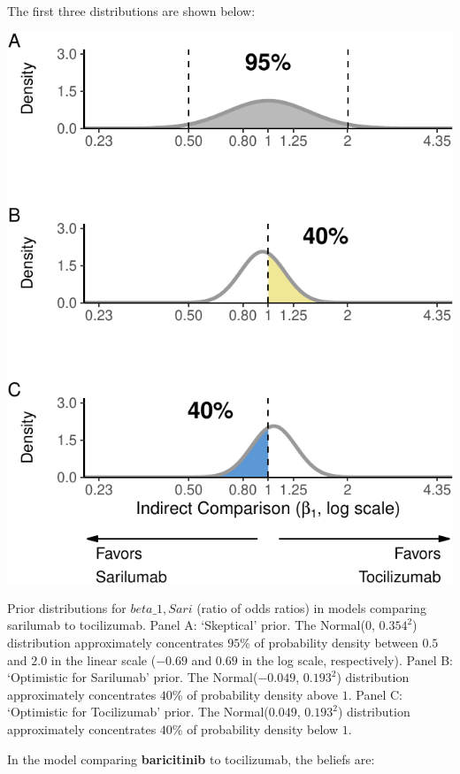 \documentclass[
  12pt,
]{article}
\begin{document}
The first three distributions are shown below:

\begin{center}\includegraphics{supplementary_material_files/figure-latex/all priors sari meta regressions-1} \end{center}

Prior distributions for \(beta\_{1, Sari}\) (ratio of odds ratios) in
models comparing sarilumab to tocilizumab. Panel A: `Skeptical' prior.
The Normal(\(0\), \(0.354^2\)) distribution approximately concentrates
\(95\)\% of probability density between \(0.5\) and \(2.0\) in the
linear scale (\(-0.69\) and \(0.69\) in the log scale, respectively).
Panel B: `Optimistic for Sarilumab' prior. The Normal(\(-0.049\),
\(0.193^2\)) distribution approximately concentrates \(40\)\% of
probability density above \(1\). Panel C: `Optimistic for Tocilizumab'
prior. The Normal(\(0.049\), \(0.193^2\)) distribution approximately
concentrates \(40\)\% of probability density below \(1\).

\newpage

In the model comparing \textbf{baricitinib} to tocilizumab, the beliefs
are:
\end{document}
